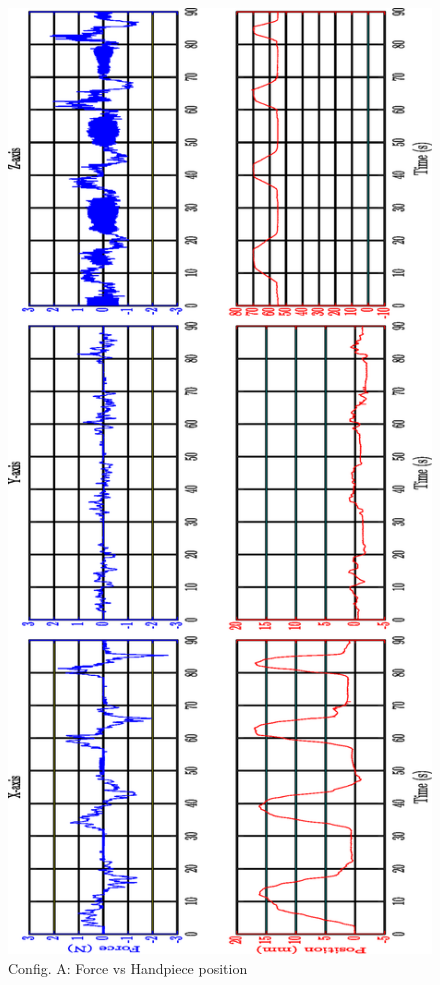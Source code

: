 \begin{figure}[htbp]
\begin{center}
\includegraphics[width=0.7\linewidth]{Images/exp/ConfigA_3.eps}
\caption{Config. A: Force vs Handpiece position}
\label{fig: exp1_1_3}
\end{center}
\end{figure}

